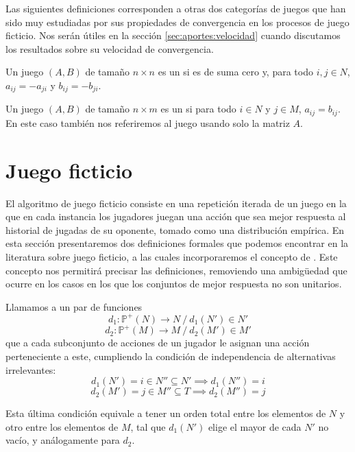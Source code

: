 Las siguientes definiciones corresponden a otras dos categorías de juegos que han sido muy estudiadas por sus propiedades de convergencia en los procesos de juego ficticio. Nos serán útiles en la sección \ref{sec:aportes:velocidad} cuando discutamos los resultados sobre su velocidad de convergencia.

\begin{definition}
    Un juego $(A, B)$ de tamaño $n \times n$ es un  si es de suma cero y, para todo $i, j \in N$, $a_{ij} = -a_{ji}$ y $b_{ij} = -b_{ji}$.
\end{definition}

\begin{definition}
    Un juego $(A, B)$ de tamaño $n \times m$ es un  si para todo $i \in N$ y $j \in M$, $a_{ij} = b_{ij}$. En este caso también nos referiremos al juego usando solo la matriz $A$.
\end{definition}


\section{Juego ficticio} \label{sec:def:fp}

El algoritmo de juego ficticio consiste en una repetición iterada de un juego en la que en cada instancia los jugadores juegan una acción que sea mejor respuesta al historial de jugadas de su oponente, tomado como una distribución empírica. En esta sección presentaremos dos definiciones formales que podemos encontrar en la literatura sobre juego ficticio, a las cuales incorporaremos el concepto de . Este concepto nos permitirá precisar las definiciones, removiendo una ambigüedad que ocurre en los casos en los que los conjuntos de mejor respuesta no son unitarios.

\begin{definition} \label{def:reglas:desempate}
    Llamamos  a un par de funciones
    \[ d_1: \mathbb{P}^+(N) \rightarrow N \ / \ d_1(N') \in N' \]
    \[ d_2: \mathbb{P}^+(M) \rightarrow M \ / \ d_2(M') \in M' \]
    que a cada subconjunto de acciones de un jugador le asignan una acción perteneciente a este, cumpliendo la condición de independencia de alternativas irrelevantes:
    \[ d_1(N') = i \in N'' \subseteq N' \implies  d_1(N'') = i \]
    \[ d_2(M') = j \in M'' \subseteq T  \implies  d_2(M'') = j \]

Esta última condición equivale a tener un orden total entre los elementos de $N$ y otro entre los elementos de $M$, tal que $d_1(N')$ elige el mayor de cada $N'$ no vacío, y análogamente para $d_2$. 
\end{definition}


